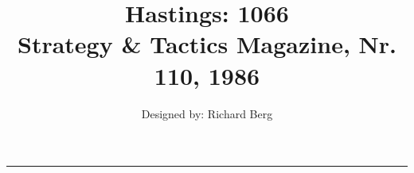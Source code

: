 \documentclass[a4paper,11pt,twocolumn]{article}
\title{%
    Hastings: 1066 \\
    \vspace{0.5em}
    \large Strategy \& Tactics Magazine, Nr. 110, 1986}
\author{Designed by: Richard Berg}
\affil{This document created by: Daniel Berger}
\begin{document}
\maketitle
\noindent\rule{\textwidth}{2pt}
\tableofcontents













\end{document}
